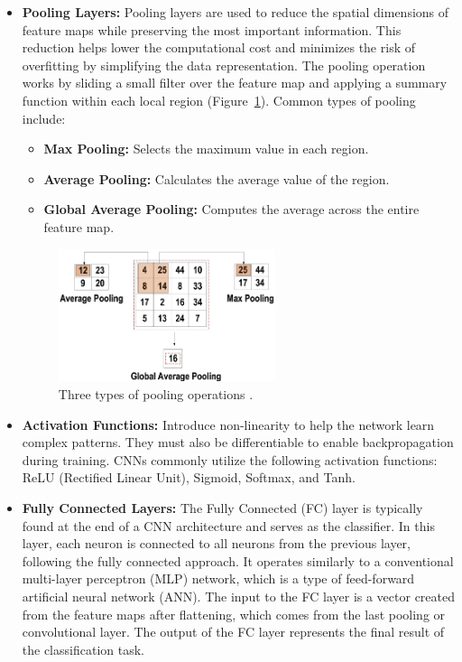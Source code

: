 \begin{itemize}
    \item \textbf{Pooling Layers:} Pooling layers are used to reduce the spatial dimensions of feature maps while preserving the most important information. This reduction helps lower the computational cost and minimizes the risk of overfitting by simplifying the data representation. The pooling operation works by sliding a small filter over the feature map and applying a summary function within each local region (Figure~\ref{fig:figure06}). Common types of pooling include:
    \begin{itemize}
        \item \textbf{Max Pooling:} Selects the maximum value in each region.
        \item \textbf{Average Pooling:} Calculates the average value of the region.
        \item \textbf{Global Average Pooling:} Computes the average across the entire feature map.
     \end{itemize}  
    
     \begin{figure}[H] %
        \centering
        \includegraphics[width=0.6\textwidth]{chapters/chapter1/images/Figure06.png}
        \caption{Three types of pooling operations \parencite{alzubaidi2021review}.}
        \label{fig:figure06}
    \end{figure}
 
    \item \textbf{Activation Functions:} Introduce non-linearity to help the network learn complex patterns. They must also be differentiable to enable backpropagation during training. CNNs commonly utilize the following activation functions: ReLU (Rectified Linear Unit), Sigmoid, Softmax, and Tanh.
    \item \textbf{Fully Connected Layers:} The Fully Connected (FC) layer is typically found at the end of a CNN architecture and serves as the classifier. In this layer, each neuron is connected to all neurons from the previous layer, following the fully connected approach. It operates similarly to a conventional multi-layer perceptron (MLP) network, which is a type of feed-forward artificial neural network (ANN). The input to the FC layer is a vector created from the feature maps after flattening, which comes from the last pooling or convolutional layer. The output of the FC layer represents the final result of the classification task.
    
\end{itemize}

